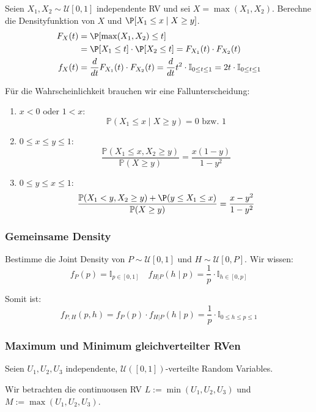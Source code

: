 Seien \(X_1, X_2 \sim \mathcal{U}[0,1]\) independente RV und sei \(X = \max (X_1, X_2)\). Berechne die Densityfunktion von \(X\) und \(\P[X_1 \leq x \mid X \geq y]\).
\begin{align*}
	F_X(t) & = \P[\max(X_1, X_2) \leq t]                                                                                                              \\ &= \P[X_1 \leq t] \cdot \P[X_2 \leq t] = F_{X_1}(t) \cdot F_{X_2}(t) \\
	f_X(t) & = \frac{d}{dt} F_{X_1}(t) \cdot F_{X_2}(t) = \frac{d}{dt} t^2 \cdot \mathbb{I}_{0 \leq t \leq 1} = 2t \cdot \mathbb{I}_{0 \leq t \leq 1}
\end{align*}

Für die Wahrscheinlichkeit brauchen wir eine Fallunterscheidung: \smallskip

\begin{enumerate}
	\item \(x < 0\) oder \(1 < x\):
	      \[\mathbb{P}(X_1 \leq x \mid X \geq y) = 0 \text{ bzw. } 1\]
	\item \(0 \leq x \leq y \leq 1\):
	      \[\frac{\mathbb{P}(X_1 \leq x, X_2 \geq y)}{\mathbb{P}(X \geq y)} = \frac{x(1-y)}{1 - y^2}\]
	\item \(0 \leq y \leq x \leq 1\):
	      \[\frac{\mathbb{P}(X_1 < y, X_2 \geq y) + \P(y \leq X_1 \leq x)}{\mathbb{P}(X \geq y)} = \frac{x - y^2}{1 - y^2}\]
\end{enumerate}

\subsubsection*{Gemeinsame Density}

Bestimme die Joint Density von \(P \sim \mathcal{U}[0,1]\) und \(H \sim \mathcal{U}[0,P]\). Wir wissen:
\[f_P(p) = \mathbb I_{p \in [0,1]} \quad f_{H | P}(h \mid p) = \frac{1}{p} \cdot \mathbb{I}_{h \in [0,p]}\]

\noindent
Somit ist:
\[f_{P, H} (p, h) = f_P(p) \cdot f_{H | P}(h \mid p) = \frac{1}{p} \cdot \mathbb I_{0 \leq h \leq p \leq 1}\]

\subsubsection*{Maximum und Minimum gleichverteilter RVen}
Seien $U_1, U_2, U_3$ independente, $\mathcal{U}([0,1])$-verteilte Random Variables. 

Wir betrachten die continuousen RV $L := \min(U_1, U_2, U_3)$ und $M:=\max(U_1, U_2, U_3)$.


